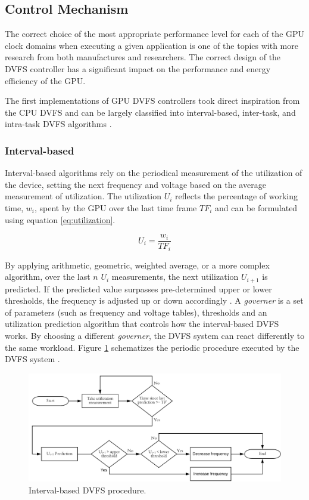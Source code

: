 \subsection{Control Mechanism}

The correct choice of the most appropriate performance level for each of the GPU clock domains when executing a given application is one of the topics with more research from both manufactures and researchers. The correct design of the DVFS controller has a significant impact on the performance and energy efficiency of the GPU.

The first implementations of GPU DVFS controllers took direct inspiration from the CPU DVFS and can be largely classified into interval-based, inter-task, and intra-task DVFS algorithms \cite{boyer_improving_2013}. 

\subsubsection{Interval-based}

Interval-based algorithms rely on the periodical measurement of the utilization of the device, setting the next frequency and voltage based on the average measurement of utilization. The utilization $U_{i}$ reflects the percentage of working time, $w_{i}$, spent by the GPU over the last time frame  $TF_{i}$ and can be formulated using equation \ref{eq:utilization}.

\begin{equation}
    U_i=\frac{w_i}{TF_i}
    \label{eq:utilization}
\end{equation}

By applying arithmetic, geometric, weighted average, or a more complex algorithm, over the last $n$ $U_{i}$ measurements,  the next utilization $U_{i+1}$ is predicted. If the predicted value surpasses pre-determined upper or lower thresholds, the frequency is adjusted up or down accordingly \cite{seongki_gpgpu-perf:_2015}. 
A \textit{governer} is a set of parameters (such as frequency and voltage tables), thresholds and an utilization prediction algorithm that controls how the interval-based DVFS works. By choosing a different \textit{governer}, the DVFS system can react differently to the same workload. Figure \ref{fig:DVFSprocedure} schematizes the periodic procedure executed by the DVFS system \cite{seongki_gpgpu-perf:_2015}. 

\begin{figure}[!htb]
  \centering
  \includegraphics[width=\textwidth]{Figures/StateArt/DVFSprogram.png}
  \caption[Controller]{Interval-based DVFS procedure.}
  \label{fig:DVFSprocedure}
\end{figure}

